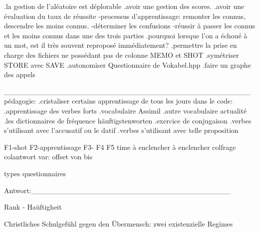 .la gestion de l'aléatoire est déplorable
.avoir une gestion des scores.
.avoir une évaluation du taux de réussite
-processus d'apprentissage: remonter les connus, descendre les moins connus.
-déterminer les confusions
-réussir à passer les connus et les moins connus dans une des trois parties
.pourquoi lorsque l'on a échoué à un mot, est il très souvent reproposé immédiatement?
.permettre la prise en charge des fichiers ne possédant pas de colonne MEMO et SHOT
.symétriser STORE avec SAVE
.autonomiser Questionnaire de Vokabel.hpp
.faire un graphe des appels



_______________________________________________
pédagogie:
.cristaliser certains apprentissage de tous les jours dans le code:
.apprentissage des verbes forts
.vocabulaire Assimil
.autre vocabulaire actualité
.les dictionnaires de fréquence häuftigstenworten
.exercice de conjugaison
.verbes s'utilisant avec l'accusatif ou le datif
.verbes s'utilisant avec telle proposition


F1-shot         F2-apprentissage F3- F4               F5 time
à enclencher    à enclencher     colfrage colantwort
                var: offset
                     von
                     bis

types questionnaires





Antwort:______________________________________

                                                Rank - Haüftigheit

Christliches Schulgefühl gegen den Übermensch: zwei existenzielle Regimes

